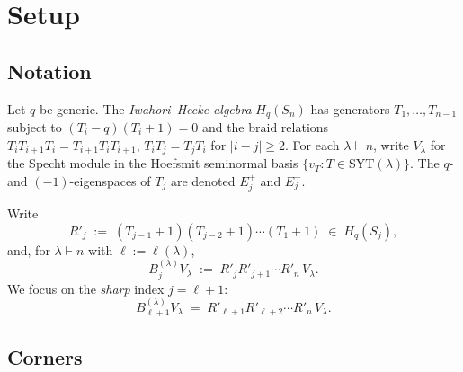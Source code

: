 \documentclass[11pt]{article}
\theoremstyle{definition}
\begin{document}
\begin{abstract}
\emph{Non-stable warning.} New computational data at $\lambda = (4,3,2,1)$
with $n = 10$ (zero trailing $1$-rows, $q = 0$) gives
$\dim = 24 \ne 16 = f^{(3,2,1)}$. The closed-form formula
\emph{fails} outside the stable regime; the recursion itself breaks down
because its descent step requires $\lambda_\ell = 1$ to define $c_*$,
and removing $\{c_i, c_*\}$ can produce a $\mu_i$ whose last row exceeds
$1$. Empirically, all $9$ tested shapes with $q \ge 2$ trailing $1$-rows
satisfy the closed form; $q = 1$ is untested; $q = 0$ fails. The precise
stability threshold is open.

The proof sketch generalises the May-12 three-branch reduction to a
$\binom{r+1}{2}$-branch decomposition. Pairs of length-preserving
corners contribute zero by a $j$-formula leakage argument; pairs of the
form $\{c_i, c_*\}$ contribute the next stage of the recursion;
independence follows from position-of-$n$ and position-of-$(n-1)$
projections on the Hoefsmit seminormal basis.
\end{abstract}

\section{Setup}\label{sec:setup}

\subsection{Notation}

Let $q$ be generic. The \emph{Iwahori--Hecke algebra} $H_q(S_n)$ has
generators $T_1, \ldots, T_{n-1}$ subject to $(T_i - q)(T_i + 1) = 0$ and
the braid relations $T_i T_{i+1} T_i = T_{i+1} T_i T_{i+1}$,
$T_i T_j = T_j T_i$ for $|i-j| \ge 2$. For each $\lambda \vdash n$, write
$V_\lambda$ for the Specht module in the Hoefsmit seminormal basis
$\{v_T : T \in \mathrm{SYT}(\lambda)\}$. The $q$- and $(-1)$-eigenspaces of
$T_j$ are denoted $E_j^+$ and $E_j^-$.

Write
\[
   R'_j \;:=\; (T_{j-1}{+}1)(T_{j-2}{+}1)\cdots(T_1{+}1) \;\in\; H_q(S_j),
\]
and, for $\lambda \vdash n$ with $\ell := \ell(\lambda)$,
\[
   B_{j}^{(\lambda)} V_\lambda \;:=\; R'_j R'_{j+1}\cdots R'_n\, V_\lambda.
\]
We focus on the \emph{sharp} index $j = \ell + 1$:
\[
   B_{\ell+1}^{(\lambda)} V_\lambda \;=\; R'_{\ell+1} R'_{\ell+2}\cdots R'_n\, V_\lambda.
\]

\subsection{Corners}
\end{document}
